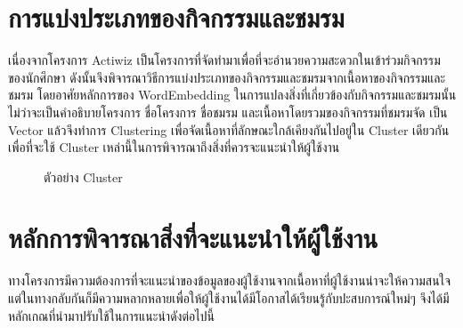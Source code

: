 \documentclass[14pt,oneside,openright,a4paper]{cpe-thai-project}
\begin{document}
\section{การแบ่งประเภทของกิจกรรมและชมรม}
เนื่องจากโครงการ Actiwiz เป็นโครงการที่จัดทำมาเพื่อที่จะอำนวยความสะดวกในเข้าร่วมกิจกรรมของนักศึกษา ดังนั้นจึงพิจารณาวิธีการแบ่งประเภทของกิจกรรมและชมรมจากเนื้อหาของกิจกรรมและชมรม โดยอาศัยหลักการของ WordEmbedding ในการแปลงสิ่งที่เกี่ยวข้องกับกิจกรรมและชมรมนั้น ไม่ว่าจะเป็นคำอธิบายโครงการ ชื่อโครงการ ชื่อชมรม และเนื้อหาโดยรวมของกิจกรรมที่ชมรมจัด เป็น Vector แล้วจึงทำการ Clustering เพื่อจัดเนื้อหาที่ลักษณะใกล้เคียงกันไปอยู่ใน Cluster เดียวกัน เพื่อที่จะใช้ Cluster เหล่านี้ในการพิจารณาถึงสิ่งที่ควรจะแนะนำให้ผู้ใช้งาน
\begin{figure}[!h]\centering
  \setlength{\fboxrule}{0.5mm} %
  \setlength{\fboxsep}{0.5cm}
  \caption{ตัวอย่าง Cluster}\label{fig:project_cluster}
\end{figure}
\newpage
\section{หลักการพิจารณาสิ่งที่จะแนะนำให้ผู้ใช้งาน}
ทางโครงการมีความต้องการที่จะแนะนำของข้อมูลของผู้ใช้งานจากเนื้อหาที่ผู้ใช้งานน่าจะให้ความสนใจ แต่ในทางกลับกันก็มีความหลากหลายเพื่อให้ผู้ใช้งานได้มีโอกาสได้เรียนรู้กับปะสบการณ์ใหม่ๆ จึงได้มีหลักเกณที่นำมาปรับใช้ในการแนะนำดังต่อไปนี้
\end{document}
